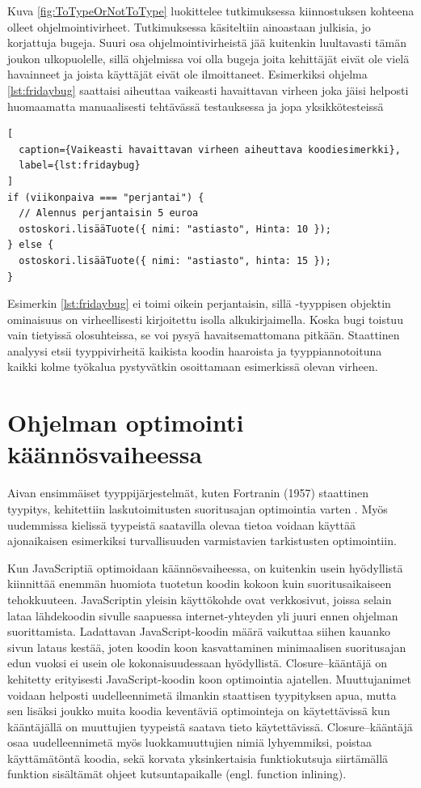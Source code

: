 Kuva \ref{fig:ToTypeOrNotToType} luokittelee
tutkimuksessa \cite{ToTypeOrNotToType} kiinnostuksen kohteena
olleet ohjelmointivirheet. Tutkimuksessa käsiteltiin ainoastaan
julkisia, jo korjattuja bugeja. Suuri osa ohjelmointivirheistä jää
kuitenkin luultavasti tämän joukon ulkopuolelle, sillä ohjelmissa voi
olla bugeja joita kehittäjät eivät ole vielä havainneet ja joista
käyttäjät eivät ole ilmoittaneet. Esimerkiksi ohjelma \ref{lst:fridaybug}
saattaisi aiheuttaa vaikeasti havaittavan virheen joka jäisi helposti 
huomaamatta manuaalisesti tehtävässä testauksessa ja jopa yksikkötesteissä
\begin{lstlisting}[
  caption={Vaikeasti havaittavan virheen aiheuttava koodiesimerkki},
  label={lst:fridaybug}
]
if (viikonpaiva === "perjantai") {
  // Alennus perjantaisin 5 euroa
  ostoskori.lisääTuote({ nimi: "astiasto", Hinta: 10 });
} else {
  ostoskori.lisääTuote({ nimi: "astiasto", hinta: 15 });
}
\end{lstlisting}
Esimerkin \ref{lst:fridaybug} ei toimi oikein perjantaisin, sillä
-tyyppisen
objektin ominaisuus  on virheellisesti kirjoitettu isolla
alkukirjaimella. Koska bugi toistuu vain tietyissä olosuhteissa, se voi pysyä
havaitsemattomana pitkään. Staattinen analyysi etsii tyyppivirheitä
kaikista koodin haaroista ja tyyppiannotoituna kaikki kolme työkalua
pystyvätkin osoittamaan esimerkissä olevan virheen.

\section{Ohjelman optimointi käännösvaiheessa}
Aivan ensimmäiset tyyppijärjestelmät, kuten Fortranin (1957) staattinen tyypitys,
kehitettiin laskutoimitusten suoritusajan optimointia varten \cite{TypesAndProgrammingLanguages}.
Myös uudemmissa kielissä tyypeistä saatavilla olevaa tietoa
voidaan käyttää ajonaikaisen esimerkiksi turvallisuuden varmistavien
tarkistusten optimointiin.

Kun JavaScriptiä optimoidaan käännösvaiheessa, on kuitenkin usein hyödyllistä
kiinnittää enemmän huomiota tuotetun koodin kokoon kuin suoritusaikaiseen
tehokkuuteen. JavaScriptin yleisin käyttökohde ovat verkkosivut,
joissa selain lataa lähdekoodin sivulle saapuessa
internet-yhteyden yli juuri ennen ohjelman suorittamista. Ladattavan\newline
JavaScript-koodin määrä vaikuttaa siihen kauanko sivun lataus
kestää, joten koodin koon kasvattaminen minimaalisen suoritusajan
edun vuoksi ei usein ole kokonaisuudessaan hyödyllistä.
Closure–kääntäjä on kehitetty erityisesti
JavaScript-koodin koon optimointia ajatellen. Muuttujanimet voidaan helposti
uudelleennimetä ilmankin staattisen tyypityksen apua, mutta sen lisäksi
joukko muita koodia keventäviä optimointeja on käytettävissä kun kääntäjällä
on muuttujien tyypeistä saatava tieto käytettävissä. Closure–kääntäjä osaa
uudelleennimetä myös luokkamuuttujien nimiä lyhyemmiksi, poistaa
käyttämätöntä koodia, sekä korvata yksinkertaisia funktiokutsuja siirtämällä
funktion sisältämät ohjeet kutsuntapaikalle (engl. function inlining).

